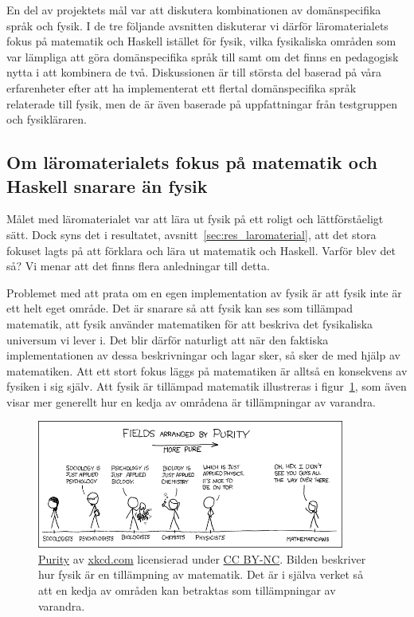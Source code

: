 En del av projektets mål var att diskutera kombinationen av
domänspecifika språk och fysik. I de tre följande avsnitten diskuterar vi därför
läromaterialets fokus på matematik och Haskell istället för fysik, vilka
fysikaliska områden som var lämpliga att göra domänspecifika språk till samt om
det finns en pedagogisk nytta i att kombinera de två. Diskussionen är till
största del baserad på våra erfarenheter efter att ha implementerat ett flertal
domänspecifika språk relaterade till fysik, men de är även baserade på
uppfattningar från testgruppen och fysikläraren.


\subsection{Om läromaterialets fokus på matematik och Haskell snarare än
fysik}\label{sec:fpf}

Målet med läromaterialet var att lära ut fysik på ett roligt och lättförståeligt
sätt. Dock syns det i resultatet, avsnitt~\ref{sec:res_laromaterial}, att det
stora fokuset lagts på att förklara och lära ut matematik och Haskell. Varför
blev det så? Vi menar att det finns flera anledningar till detta. 

Problemet med att prata om en egen implementation av fysik är att fysik inte är
ett helt eget område. Det är snarare så att fysik kan ses som tillämpad
matematik, att fysik använder matematiken för att beskriva det fysikaliska
universum vi lever i. Det blir därför naturligt att när den faktiska
implementationen av dessa beskrivningar och lagar sker, så sker de med hjälp av
matematiken. Att ett stort fokus läggs på matematiken är alltså en
konsekvens av fysiken i sig själv. Att fysik är tillämpad matematik illustreras i figur~\ref{fig:xkcd}, som även visar mer generellt hur en kedja av områdena är tillämpningar av varandra.

\begin{figure}[tph]
  \centering
  \includegraphics[width=0.9\textwidth]{figure/purity.png}
  \caption{\href{https://xkcd.com/435/}{Purity} av
  \href{https://xkcd.com}{xkcd.com} licensierad under
\href{https://creativecommons.org/licenses/by-nc/2.5/}{CC BY-NC}. Bilden beskriver hur fysik är en tillämpning av matematik. Det är i själva verket
så att en kedja av områden kan betraktas som tillämpningar av
varandra.}\label{fig:xkcd} 
\end{figure}

